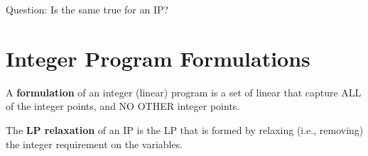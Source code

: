 \documentclass[11pt]{article}
\theoremstyle{definition}
\newcommand{\answerbox}[3]{%
  \fbox{%
    \begin{minipage}[#1]{#2}
      \hfill\vspace{#3}
    \end{minipage}
  }
}
\newcommand{\wordbox}{\answerbox{c}{1.2in}{.7cm}}
\begin{document}
Question: Is the same true for an IP?

\section{Integer Program Formulations}

\begin{tcolorbox}
A \textbf{formulation} of an integer (linear) program is a set of linear \wordbox that capture ALL of the \wordbox integer points, and NO OTHER integer points.
\end{tcolorbox}

\vfill

\begin{tcolorbox}
The \textbf{LP relaxation} of an IP is the LP that is formed by relaxing (i.e., removing) the integer requirement on the variables.
\end{tcolorbox}
\end{document}
